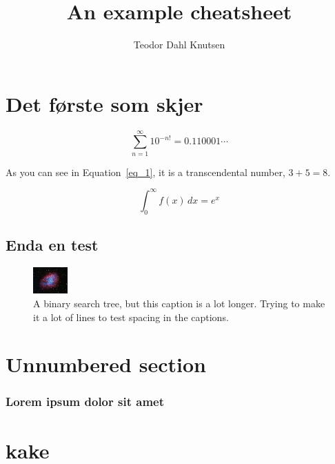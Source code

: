 \documentclass[defaultpackages]{cheatsheet}
\title{An example cheatsheet}
\author{Teodor Dahl Knutsen}
\begin{document}
\tableofcontents

\section{Det første som skjer}

\lipsum[1-1]

\begin{equation}
	\sum_{n=1}^\infty 10^{-n!}=0.110001\cdots\label{eq_1}
\end{equation}

As you can see in Equation~\ref{eq_1}, it is a transcendental number, $3 + 5 = 8$.

\lipsum[2-2]

\[ \int_0^\infty f(x)\, dx = e^x \]

\lipsum[1-1]

\subsection{Enda en test}

\begin{figure}[H]
\begin{center}
\includegraphics[width=50px] {crab_nebula.jpg}
\end{center}
\caption{A binary search tree, but this caption is a lot longer. Trying to make it a lot of lines to test spacing in the captions.}\label{fig:ackseq}
\end{figure}

\lipsum[1-1]

\section*{Unnumbered section}

\subsubsection{Lorem ipsum dolor sit amet}

\lipsum[1-1]

\section{kake}

\lipsum[3-50]
\end{document}
